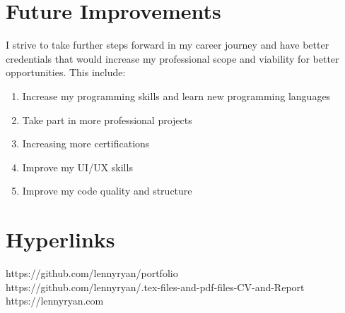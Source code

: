 \documentclass[12pt,a4paper,oneside]{report}
\begin{document}
\section{Future Improvements}
I strive to take further steps forward in my career journey and have better credentials that would increase my professional scope and viability for better opportunities. This include:
\begin{enumerate}
    \item Increase my programming skills and learn new programming languages
    \item Take part in more professional projects
    \item Increasing more certifications 
    \item Improve my UI/UX skills
    \item Improve my code quality and structure
\end{enumerate}


\section{Hyperlinks}
https://github.com/lennyryan/portfolio\\
https://github.com/lennyryan/.tex-files-and-pdf-files-CV-and-Report\\
https://lennyryan.com
\end{document}
